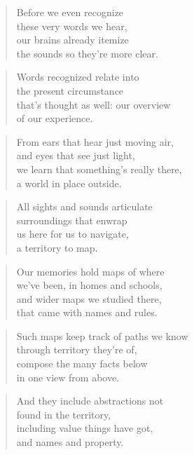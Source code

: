 \documentclass[14pt,a4paper]{article}
\begin{document}
\begin{verse}
Before we even recognize\\
these very words we hear,\\
our brains already itemize\\
the sounds so they’re more clear.
\end{verse}

\begin{verse}
Words recognized relate into\\
the present circumstance\\
that’s thought as well: our overview\\
of our experience.
\end{verse}

\begin{verse}
From ears that hear just moving air,\\
and eyes that see just light,\\
we learn that something’s really there,\\
a world in place outside.
\end{verse}

\begin{verse}
All sights and sounds articulate\\
surroundings that enwrap\\
us here for us to navigate,\\
a territory to map.
\end{verse}

\begin{verse}
Our memories hold maps of where\\
we’ve been, in homes and schools,\\
and wider maps we studied there,\\
that came with names and rules.
\end{verse}

\begin{verse}
Such maps keep track of paths we know\\
through territory they’re of,\\
compose the many facts below\\
in one view from above.
\end{verse}

\begin{verse}
And they include abstractions not\\
found in the territory,\\
including value things have got,\\
and names and property.
\end{verse}
\end{document}
